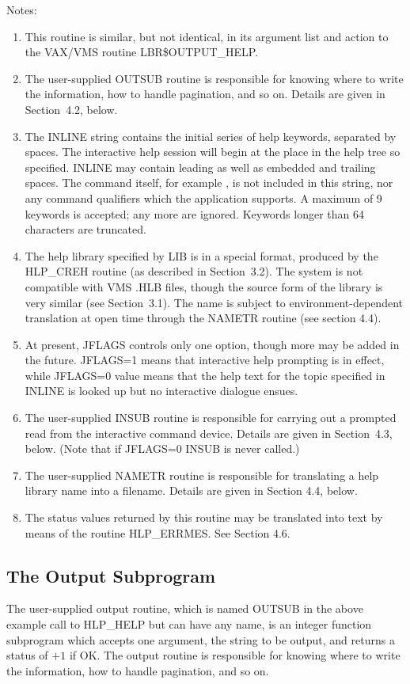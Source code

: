 \documentclass[11pt,nolof]{starlink}
\providecommand{\qt}[1]{``{\tt{#1}}''}
\providecommand{\fstring}[1]{\hbox{\hspace{0.05em}{\qt{#1}}\hspace{0.05em}}}
\begin{document}
Notes:
\nopagebreak
\begin{enumerate}
\item This routine is similar, but not identical, in its argument list
and action to the VAX/VMS routine LBR\$OUTPUT\_HELP.
\item The user-supplied OUTSUB routine is responsible for
knowing where to
write the information, how to handle pagination, and so on.  Details
are given in Section~4.2, below.
\item The INLINE string contains the initial series of help keywords,
separated by spaces.  The interactive help session will begin at the
place in the help tree so specified.  INLINE may contain leading as well as
embedded and trailing spaces.  The command itself, for example
\fstring{HELP}, is not included in this string, nor any command
qualifiers which the application supports.  A maximum of 9 keywords is
accepted;  any more are ignored.  Keywords longer than 64 characters
are truncated.
\item The help library specified by LIB is in a special format, produced by
the HLP\_CREH routine
(as described in Section~3.2).  The system is not compatible with
VMS .HLB files, though the source form of the library is very
similar (see Section~3.1).  The name is subject to environment-dependent
translation at open time through the NAMETR routine (see
section 4.4).
\item At present, JFLAGS controls only one option, though more
may be added in the future.  JFLAGS=1 means that
interactive help prompting is in effect, while JFLAGS=0
value means that the help text for the topic specified in
INLINE is looked up but no interactive dialogue ensues.
\item The user-supplied INSUB routine is responsible for
carrying out a prompted read from the interactive command device.
Details are given in Section~4.3, below. (Note that if JFLAGS=0
INSUB is never called.)
\item The user-supplied NAMETR routine is responsible for translating
a help library name into a filename.  Details are given in Section 4.4,
below.
\item The status values returned by this routine may be translated into
text by means of the routine HLP\_ERRMES.  See Section 4.6.
\end{enumerate}

\subsection{The Output Subprogram}
The user-supplied output routine, which is named OUTSUB in the above
example call to HLP\_HELP but can have any name,
is an integer function subprogram which
accepts one argument, the string to be output, and returns a
status of $+1$ if OK.  The output routine is responsible for knowing where to
write the information, how to handle pagination, and so on.
\end{document}
